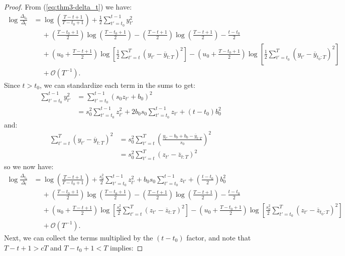 \begin{proof}
From (\ref{eq:thm3-delta_t}) we have:
\begin{align*}
    \log \frac{\Delta_{t_0}}{\Delta_t} &= \log \left(\frac{T - t + 1}{T - t_0 +1} \right) + \frac{1}{2} \sum_{t' = t_0}^{t - 1} y_{t'}^2 \\
    &\quad\: + \left(\frac{T - t_0 + 1}{2}\right) \log\left(\frac{T-t_0+1}{2}\right) - \left(\frac{T - t + 1}{2}\right) \log\left(\frac{T-t+1}{2}\right) - \frac{t-t_0}{2} \\
    &\quad\: + \left(u_0 + \frac{T - t +1}{2}\right)\log\left[ \frac{1}{2}\sum_{t'=t}^T (y_{t'} - \overline{y}_{t:T})^2 \right]  - \left(u_0 + \frac{T - t_0 +1}{2}\right)\log\left[\frac{1}{2}\sum_{t'=t_0}^T (y_{t'} - \overline{y}_{t_0:T})^2 \right] \\
    &\quad\: + \mathcal{O}(T^{-1}) .
\end{align*}
Since $t > t_0$, we can standardize each term in the sums to get:
\begin{align*}
    \sum_{t' = t_0}^{t - 1} y_{t'}^2 &= \sum_{t' = t_0}^{t - 1} (s_0z_{t'} + b_0)^2 \\
    &= s_0^2 \sum_{t' = t_0}^{t - 1} z_{t'}^2 + 2 b_0 s_0 \sum_{t' = t_0}^{t - 1} z_{t'} + (t-t_0)b_0^2
\end{align*}
and:
\begin{align*}
    \sum_{t'=t}^T (y_{t'} - \overline{y}_{t:T})^2 &= s_0^2\sum_{t'=t}^T \left(\frac{y_{t'} - b_0 + b_0 - \overline{y}_{t:T}
    }{s_0}\right)^2 \\
    &= s_0^2\sum_{t'=t}^T (z_{t'} - \overline{z}_{t:T})^2 
\end{align*}
so we now have:
\begin{align*}
    \log \frac{\Delta_{t_0}}{\Delta_t} &= \log \left(\frac{T - t + 1}{T - t_0 +1} \right) + \frac{s_0^2}{2} \sum_{t' = t_0}^{t - 1} z_{t'}^2 + b_0 s_0 \sum_{t' = t_0}^{t - 1} z_{t'} + \left(\frac{t-t_0}{2}\right)b_0^2 \\
    &\quad\: + \left(\frac{T - t_0 + 1}{2}\right) \log\left(\frac{T-t_0+1}{2}\right) - \left(\frac{T - t + 1}{2}\right) \log\left(\frac{T-t+1}{2}\right) - \frac{t-t_0}{2} \\
    &\quad\: + \left(u_0 + \frac{T - t +1}{2}\right)\log\left[ \frac{s_0^2}{2}\sum_{t'=t}^T (z_{t'} - \overline{z}_{t:T})^2 \right]  - \left(u_0 + \frac{T - t_0 +1}{2}\right)\log\left[\frac{s_0^2}{2}\sum_{t'=t_0}^T (z_{t'} - \overline{z}_{t_0:T})^2 \right] \\
    &\quad\: + \mathcal{O}(T^{-1}).
\end{align*}
Next, we can collect the terms multiplied by the $(t-t_0)$ factor, and note that $T-t+1 > cT$ and $T-t_0+1 < T$ implies:

\end{proof}
